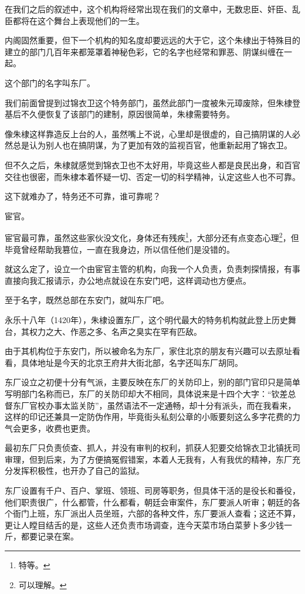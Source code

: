 \begin{multicols}{\theparacolNo}
在我们之后的叙述中，这个机构将经常出现在我们的文章中，无数忠臣、奸臣、乱臣都将在这个舞台上表现他们的一生。

内阁固然重要，但下一个机构的知名度却要远远的大于它，这个朱棣出于特殊目的建立的部门几百年来都笼罩着神秘色彩，它的名字也经常和罪恶、阴谋纠缠在一起。

这个部门的名字叫东厂。

我们前面曾提到过锦衣卫这个特务部门，虽然此部门一度被朱元璋废除，但朱棣登基后不久便恢复了该部门的建制，原因很简单，朱棣需要特务。

像朱棣这样靠造反上台的人，虽然嘴上不说，心里却是很虚的，自己搞阴谋的人必然总是认为别人也在搞阴谋，为了更加有效的监视百官，他重新起用了锦衣卫。

但不久之后，朱棣就感觉到锦衣卫也不太好用，毕竟这些人都是良民出身，和百官交往也很密，而朱棣本着怀疑一切、否定一切的科学精神，认定这些人也不可靠。

这下就难办了，特务还不可靠，谁可靠呢？

宦官。

宦官最可靠，虽然这些家伙没文化，身体还有残疾\footnote{特等。}，大部分还有点变态心理\footnote{可以理解。}，但毕竟曾经帮助我篡位，一直在我身边，所以信任他们是没错的。

就这么定了，设立一个由宦官主管的机构，向我一个人负责，负责刺探情报，有事直接向我汇报请示，办公地点就设在东安门吧，这样调动也方便点。

至于名字，既然总部在东安门，就叫东厂吧。

永乐十八年（1420年），朱棣设置东厂，这个明代最大的特务机构就此登上历史舞台，其权力之大、作恶之多、名声之臭实在罕有匹敌。

由于其机构位于东安门，所以被命名为东厂，家住北京的朋友有兴趣可以去原址看看，具体地址是今天的北京王府井大街北部，名字还叫东厂胡同。

东厂设立之初便十分有气派，主要反映在东厂的关防印上，别的部门官印只是简单写明部门名称而已，东厂的关防印却大不相同，具体说来是十四个大字：“钦差总督东厂官校办事太监关防”，虽然语法不一定通畅，却十分有派头，而在我看来，这样的印记还兼具一定防伪作用，毕竟街头私刻公章的小贩要刻这么多字花费的力气会更多，收费也更贵。

最初东厂只负责侦查、抓人，并没有审判的权利，抓获人犯要交给锦衣卫北镇抚司审理，但到后来，为了方便搞冤假错案，本着人无我有，人有我优的精神，东厂充分发挥积极性，也开办了自己的监狱。

东厂设置有千户、百户、掌班、领班、司房等职务，但具体干活的是役长和番役，他们职责很广，什么都管，什么都看，朝廷会审案件，东厂要派人听审；朝廷的各个衙门上班，东厂派出人员坐班，六部的各种文件，东厂要派人查看；这还不算，更让人瞠目结舌的是，这些人还负责市场调查，连今天菜市场白菜萝卜多少钱一斤，都要记录在案。


\end{multicols}
